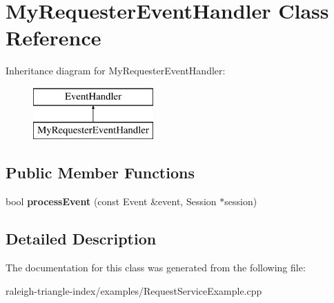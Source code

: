 \section{My\+Requester\+Event\+Handler Class Reference}
\label{class_my_requester_event_handler}
Inheritance diagram for My\+Requester\+Event\+Handler\+:\begin{figure}[H]
\begin{center}
\leavevmode
\includegraphics[height=2.000000cm]{d4/dc2/class_my_requester_event_handler}
\end{center}
\end{figure}
\subsection*{Public Member Functions}
\begin{DoxyCompactItemize}
\item 
bool {\bfseries process\+Event} (const Event \&event, Session $\ast$session)\label{class_my_requester_event_handler_a4d8e2d3492121773019c95ad68e38372}

\end{DoxyCompactItemize}


\subsection{Detailed Description}


The documentation for this class was generated from the following file\+:\begin{DoxyCompactItemize}
\item 
raleigh-\/triangle-\/index/examples/Request\+Service\+Example.\+cpp\end{DoxyCompactItemize}
